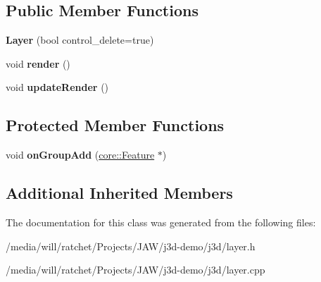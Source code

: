 \subsection*{Public Member Functions}
\begin{DoxyCompactItemize}
\item 
\hypertarget{classj3d_1_1Layer_a4ee90be1500602909d319446877bf22f}{}{\bfseries Layer} (bool control\+\_\+delete=true)\label{classj3d_1_1Layer_a4ee90be1500602909d319446877bf22f}

\item 
\hypertarget{classj3d_1_1Layer_a7fe5312b9dd98f3cc1945cb31fd66efe}{}void {\bfseries render} ()\label{classj3d_1_1Layer_a7fe5312b9dd98f3cc1945cb31fd66efe}

\item 
\hypertarget{classj3d_1_1Layer_aa3f87e5f4c5739ab54e7ee6f7b2d907a}{}void {\bfseries update\+Render} ()\label{classj3d_1_1Layer_aa3f87e5f4c5739ab54e7ee6f7b2d907a}

\end{DoxyCompactItemize}
\subsection*{Protected Member Functions}
\begin{DoxyCompactItemize}
\item 
\hypertarget{classj3d_1_1Layer_a2c10403bbb9854522ccf606a161622d5}{}void {\bfseries on\+Group\+Add} (\hyperlink{classj3d_1_1core_1_1Feature}{core\+::\+Feature} $\ast$)\label{classj3d_1_1Layer_a2c10403bbb9854522ccf606a161622d5}

\end{DoxyCompactItemize}
\subsection*{Additional Inherited Members}


The documentation for this class was generated from the following files\+:\begin{DoxyCompactItemize}
\item 
/media/will/ratchet/\+Projects/\+J\+A\+W/j3d-\/demo/j3d/layer.\+h\item 
/media/will/ratchet/\+Projects/\+J\+A\+W/j3d-\/demo/j3d/layer.\+cpp\end{DoxyCompactItemize}
